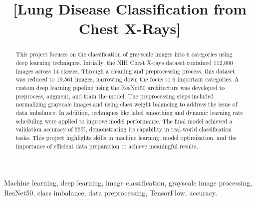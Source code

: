 \documentclass[journal]{IEEEtran}
\begin{document}
\title{[Lung Disease Classification from Chest X-Rays]}

\author{
    
    
    \vspace{1.5mm} %
    
    
}



\maketitle

\thispagestyle{fancy}

\begin{abstract}  
This project focuses on the classification of grayscale images into 6 categories using deep learning techniques. Initially, the NIH Chest X-rays dataset \cite{nih-chest-xrays} \cite{google-drive} contained 112,000 images across 14 classes. Through a cleaning and preprocessing process, this dataset was reduced to 19,561 images, narrowing down the focus to 6 important categories. A custom deep learning pipeline using the ResNet50\cite{keras-api} \cite{google-drive} architecture was developed to preprocess, augment, and train the model. The preprocessing steps included normalizing grayscale images and using class weight balancing to address the issue of data imbalance. In addition, techniques like label smoothing and dynamic learning rate scheduling were applied to improve model performance. The final model achieved a validation accuracy of 55\%, demonstrating its capability in real-world classification tasks. This project highlights skills in machine learning, model optimization, and the importance of efficient data preparation to achieve meaningful results.
\end{abstract}


\begin{IEEEkeywords}
Machine learning, deep learning, image classification, grayscale image processing, ResNet50, class imbalance, data preprocessing, TensorFlow, accuracy.
\end{IEEEkeywords}
\end{document}
